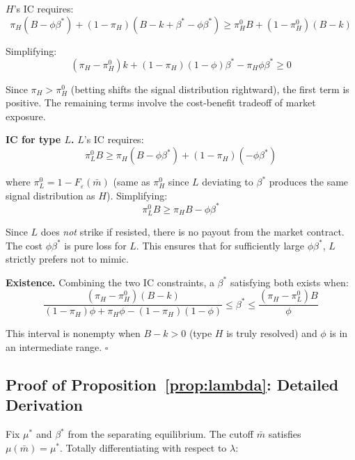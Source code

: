 \documentclass[12pt]{article}
\begin{document}
$H$'s IC requires:
\begin{equation}
\pi_H(B - \phi\beta^*) + (1-\pi_H)(B - k + \beta^* - \phi\beta^*) \geq \pi_H^0 B + (1 - \pi_H^0)(B - k)
\end{equation}

Simplifying:
\begin{equation}
(\pi_H - \pi_H^0)k + (1-\pi_H)(1-\phi)\beta^* - \pi_H \phi\beta^* \geq 0
\end{equation}

Since $\pi_H > \pi_H^0$ (betting shifts the signal distribution rightward), the first term is positive. The remaining terms involve the cost-benefit tradeoff of market exposure.

\textbf{IC for type $L$.} $L$'s IC requires:
\begin{equation}
\pi_L^0 B \geq \pi_H(B - \phi\beta^*) + (1-\pi_H)(-\phi\beta^*)
\end{equation}

where $\pi_L^0 = 1 - F_\varepsilon(\bar{m})$ (same as $\pi_H^0$ since $L$ deviating to $\beta^*$ produces the same signal distribution as $H$). Simplifying:
\begin{equation}
\pi_L^0 B \geq \pi_H B - \phi\beta^*
\end{equation}

Since $L$ does \textit{not} strike if resisted, there is no payout from the market contract. The cost $\phi\beta^*$ is pure loss for $L$. This ensures that for sufficiently large $\phi\beta^*$, $L$ strictly prefers not to mimic.

\textbf{Existence.} Combining the two IC constraints, a $\beta^*$ satisfying both exists when:
\begin{equation}
\frac{(\pi_H - \pi_H^0)(B-k)}{(1-\pi_H)\phi + \pi_H \phi - (1-\pi_H)(1-\phi)} \leq \beta^* \leq \frac{(\pi_H - \pi_L^0)B}{\phi}
\end{equation}

This interval is nonempty when $B - k > 0$ (type $H$ is truly resolved) and $\phi$ is in an intermediate range. $\square$

\subsection{Proof of Proposition~\ref{prop:lambda}: Detailed Derivation}

Fix $\mu^*$ and $\beta^*$ from the separating equilibrium. The cutoff $\bar{m}$ satisfies $\mu(\bar{m}) = \mu^*$. Totally differentiating with respect to $\lambda$:
\end{document}

